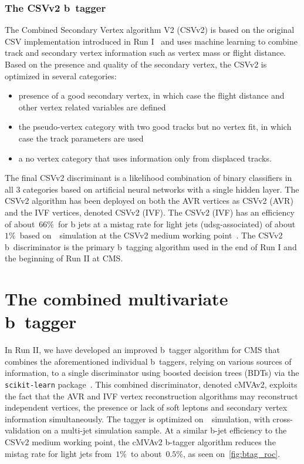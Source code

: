 \subsubsection{The CSVv2 b~tagger}
The Combined Secondary Vertex algorithm V2 (CSVv2) is based on the original CSV implementation introduced in Run I~\cite{Chatrchyan:2012jua} and uses machine learning to combine track and secondary vertex information such as vertex mass or flight distance. Based on the presence and quality of the secondary vertex, the CSVv2 is optimized in several categories:
\begin{itemize}
\item presence of a good secondary vertex, in which case the flight distance and other vertex related variables are defined
\item the pseudo-vertex category with two good tracks but no vertex fit, in which case the track parameters are used
\item a no vertex category that uses information only from displaced tracks.
\end{itemize}
The final CSVv2 discriminant is a likelihood combination of binary classifiers in all 3 categories based on artificial neural networks with a single hidden layer. The CSVv2 algorithm has been deployed on both the AVR vertices as CSVv2 (AVR) and the IVF vertices, denoted CSVv2 (IVF). The CSVv2 (IVF) has an efficiency of about~$66\%$~for b jets at a mistag rate for light jets (udsg-associated) of about~$1\%$~based on~\ttbar~simulation at the CSVv2 medium working point~\cite{CMS-PAS-BTV-15-001}. The CSVv2 b~discriminator is the primary b~tagging algorithm used in the end of Run I and the beginning of Run II at CMS.

\section{The combined multivariate b~tagger}
In Run II, we have developed an improved b~tagger algorithm for CMS that combines the aforementioned individual b~taggers, relying on various sources of information, to a single discriminator using boosted decision trees (BDTs) via the \texttt{scikit-learn} package~\cite{scikit-learn}. This combined discriminator, denoted cMVAv2, exploits the fact that the AVR and IVF vertex reconstruction algorithms may reconstruct independent vertices, the presence or lack of soft leptons and secondary vertex information simultaneously. The tagger is optimized on~\ttbar~simulation, with cross-validation on a multi-jet simulation sample. At a similar b-jet efficiency to the CSVv2 medium working point, the cMVAv2 b-tagger algorithm reduces the mistag rate for light jets from~$1\%$~to about~$0.5\%$, as seen on~\cref{fig:btag_roc}.

